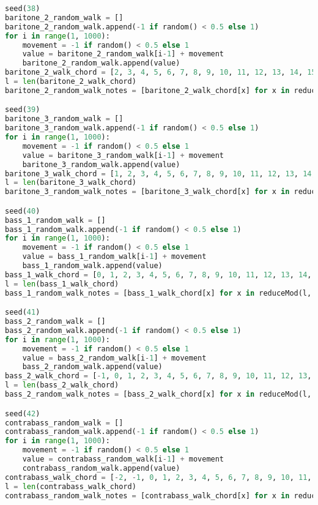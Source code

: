 \begin{lstlisting}[language=Python, caption=Invocation Source Code]
seed(38)
baritone_2_random_walk = []
baritone_2_random_walk.append(-1 if random() < 0.5 else 1)
for i in range(1, 1000):
    movement = -1 if random() < 0.5 else 1
    value = baritone_2_random_walk[i-1] + movement
    baritone_2_random_walk.append(value)
baritone_2_walk_chord = [2, 3, 4, 5, 6, 7, 8, 9, 10, 11, 12, 13, 14, 15, 16, 17, 18, 19, 20, 21, 22, 21, 20, 19, 18, 17, 16, 15, 14, 13, 12, 11, 10, 9, 8, 7, 6, 5, 4, 3, 2, 1, 0, -1, -2, -1, 0, 1, ]
l = len(baritone_2_walk_chord)
baritone_2_random_walk_notes = [baritone_2_walk_chord[x] for x in reduceMod(l, baritone_2_random_walk)]

seed(39)
baritone_3_random_walk = []
baritone_3_random_walk.append(-1 if random() < 0.5 else 1)
for i in range(1, 1000):
    movement = -1 if random() < 0.5 else 1
    value = baritone_3_random_walk[i-1] + movement
    baritone_3_random_walk.append(value)
baritone_3_walk_chord = [1, 2, 3, 4, 5, 6, 7, 8, 9, 10, 11, 12, 13, 14, 15, 16, 17, 18, 19, 20, 21, 22, 21, 20, 19, 18, 17, 16, 15, 14, 13, 12, 11, 10, 9, 8, 7, 6, 5, 4, 3, 2, 1, 0, -1, -2, -1, 0, ]
l = len(baritone_3_walk_chord)
baritone_3_random_walk_notes = [baritone_3_walk_chord[x] for x in reduceMod(l, baritone_3_random_walk)]

seed(40)
bass_1_random_walk = []
bass_1_random_walk.append(-1 if random() < 0.5 else 1)
for i in range(1, 1000):
    movement = -1 if random() < 0.5 else 1
    value = bass_1_random_walk[i-1] + movement
    bass_1_random_walk.append(value)
bass_1_walk_chord = [0, 1, 2, 3, 4, 5, 6, 7, 8, 9, 10, 11, 12, 13, 14, 15, 16, 17, 18, 19, 20, 21, 22, 21, 20, 19, 18, 17, 16, 15, 14, 13, 12, 11, 10, 9, 8, 7, 6, 5, 4, 3, 2, 1, 0, -1, -2, -1, ]
l = len(bass_1_walk_chord)
bass_1_random_walk_notes = [bass_1_walk_chord[x] for x in reduceMod(l, bass_1_random_walk)]

seed(41)
bass_2_random_walk = []
bass_2_random_walk.append(-1 if random() < 0.5 else 1)
for i in range(1, 1000):
    movement = -1 if random() < 0.5 else 1
    value = bass_2_random_walk[i-1] + movement
    bass_2_random_walk.append(value)
bass_2_walk_chord = [-1, 0, 1, 2, 3, 4, 5, 6, 7, 8, 9, 10, 11, 12, 13, 14, 15, 16, 17, 18, 19, 20, 21, 22, 21, 20, 19, 18, 17, 16, 15, 14, 13, 12, 11, 10, 9, 8, 7, 6, 5, 4, 3, 2, 1, 0, -1, -2, ]
l = len(bass_2_walk_chord)
bass_2_random_walk_notes = [bass_2_walk_chord[x] for x in reduceMod(l, bass_2_random_walk)]

seed(42)
contrabass_random_walk = []
contrabass_random_walk.append(-1 if random() < 0.5 else 1)
for i in range(1, 1000):
    movement = -1 if random() < 0.5 else 1
    value = contrabass_random_walk[i-1] + movement
    contrabass_random_walk.append(value)
contrabass_walk_chord = [-2, -1, 0, 1, 2, 3, 4, 5, 6, 7, 8, 9, 10, 11, 12, 13, 14, 15, 16, 17, 18, 19, 20, 21, 22, 21, 20, 19, 18, 17, 16, 15, 14, 13, 12, 11, 10, 9, 8, 7, 6, 5, 4, 3, 2, 1, 0, -1, ]
l = len(contrabass_walk_chord)
contrabass_random_walk_notes = [contrabass_walk_chord[x] for x in reduceMod(l, contrabass_random_walk)]


\end{lstlisting}
